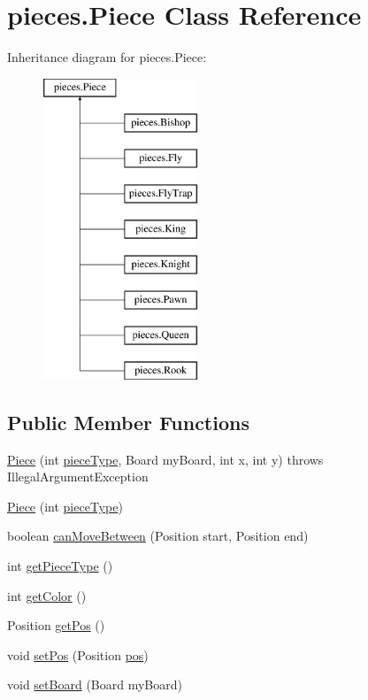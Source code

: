 \hypertarget{classpieces_1_1_piece}{\section{pieces.\-Piece Class Reference}
\label{classpieces_1_1_piece}
}
Inheritance diagram for pieces.\-Piece\-:\begin{figure}[H]
\begin{center}
\leavevmode
\includegraphics[height=9.000000cm]{classpieces_1_1_piece}
\end{center}
\end{figure}
\subsection*{Public Member Functions}
\begin{DoxyCompactItemize}
\item 
\hyperlink{classpieces_1_1_piece_a9f739de98fb95a5c379bddec6fa05a9f}{Piece} (int \hyperlink{classpieces_1_1_piece_ae40d6201d0aed36f369dd9d8f55892e3}{piece\-Type}, Board my\-Board, int x, int y)  throws Illegal\-Argument\-Exception
\item 
\hyperlink{classpieces_1_1_piece_a6cb26e7b2633c754553bf9e32d73f267}{Piece} (int \hyperlink{classpieces_1_1_piece_ae40d6201d0aed36f369dd9d8f55892e3}{piece\-Type})
\item 
boolean \hyperlink{classpieces_1_1_piece_a2217ef2be3a64bac127d9092f4ec4125}{can\-Move\-Between} (Position start, Position end)
\item 
int \hyperlink{classpieces_1_1_piece_a0a0c19217dbf20dc4b91b40798fb3083}{get\-Piece\-Type} ()
\item 
int \hyperlink{classpieces_1_1_piece_adfb40e69bb9e5a2f21a33a1e91682c44}{get\-Color} ()
\item 
Position \hyperlink{classpieces_1_1_piece_a74e034990e5f39e58ef48404102d65dd}{get\-Pos} ()
\item 
void \hyperlink{classpieces_1_1_piece_ac6422f94714df2fcddab8dc7a9372e4a}{set\-Pos} (Position \hyperlink{classpieces_1_1_piece_a9a3b5cf20c198c74a04cea615815b11c}{pos})
\item 
void \hyperlink{classpieces_1_1_piece_a3ac139a19545ca7736a850d4df5ad0c1}{set\-Board} (Board my\-Board)
\end{DoxyCompactItemize}
